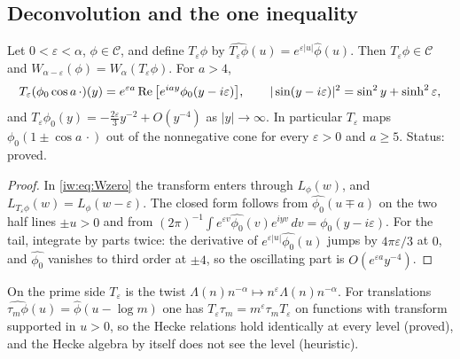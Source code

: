 \subsection*{Deconvolution and the one inequality}

\begin{lemma}\label{rg:lem:shift}
Let $0<\varepsilon<\alpha$, $\phi\in\mathcal C$, and define $T_\varepsilon\phi$ by $\widehat{T_\varepsilon\phi}(u)=e^{\varepsilon|u|}\widehat\phi(u)$. Then $T_\varepsilon\phi\in\mathcal C$ and $W_{\alpha-\varepsilon}(\phi)=W_\alpha(T_\varepsilon\phi)$. For $a>4$,
\[T_\varepsilon(\phi_0\cos a\,\cdot)(y)=e^{\varepsilon a}\operatorname{Re}\big[e^{iay}\phi_0(y-i\varepsilon)\big],\qquad |\sin(y-i\varepsilon)|^2=\sin^2y+\sinh^2\varepsilon,\]
and $T_\varepsilon\phi_0(y)=-\frac{2\varepsilon}3y^{-2}+O(y^{-4})$ as $|y|\to\infty$. In particular $T_\varepsilon$ maps $\phi_0(1\pm\cos a\,\cdot)$ out of the nonnegative cone for every $\varepsilon>0$ and $a\ge5$. Status: proved.
\end{lemma}

\begin{proof}
In \eqref{iw:eq:Wzero} the transform enters through $L_\phi(w)$, and $L_{T_\varepsilon\phi}(w)=L_\phi(w-\varepsilon)$. The closed form follows from $\widehat{\phi_0}(u\mp a)$ on the two half lines $\pm u>0$ and from $(2\pi)^{-1}\int e^{\varepsilon v}\widehat{\phi_0}(v)e^{iyv}\,dv=\phi_0(y-i\varepsilon)$. For the tail, integrate by parts twice: the derivative of $e^{\varepsilon|u|}\widehat{\phi_0}(u)$ jumps by $4\pi\varepsilon/3$ at $0$, and $\widehat{\phi_0}$ vanishes to third order at $\pm4$, so the oscillating part is $O(e^{\varepsilon a}y^{-4})$.
\end{proof}

On the prime side $T_\varepsilon$ is the twist $\Lambda(n)n^{-\alpha}\mapsto n^{\varepsilon}\Lambda(n)n^{-\alpha}$. For translations $\widehat{\tau_m\phi}(u)=\widehat\phi(u-\log m)$ one has $T_\varepsilon\tau_m=m^\varepsilon\tau_mT_\varepsilon$ on functions with transform supported in $u>0$, so the Hecke relations hold identically at every level (proved), and the Hecke algebra by itself does not see the level (heuristic).

